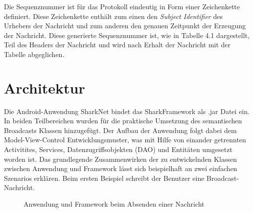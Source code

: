 Die Sequenznummer ist für das Protokoll eindeutig in Form einer Zeichenkette definiert. Diese Zeichenkette enthält zum einen den \textit{Subject Identifier} des Urhebers der Nachricht und zum anderen den genauen Zeitpunkt der Erzeugung der Nachricht. Diese generierte Sequenznummer ist, wie in Tabelle 4.1 dargestellt, Teil des Headers der Nachricht und wird nach Erhalt der Nachricht mit der Tabelle abgeglichen. 
\section{Architektur}
Die Android-Anwendung SharkNet bindet das SharkFramework als .jar Datei ein. In beiden Teilbereichen wurden für die praktische Umsetzung des semantischen Broadcasts Klassen hinzugefügt. Der Aufbau der Anwendung folgt dabei dem Model-View-Control Entwicklungsmuster, was mit Hilfe von einander getrennten Activitites, Services, Datenzugriffsobjekten (DAO) und Entitäten umgesetzt worden ist. Das grundlegende Zusammenwirken der zu entwickelnden Klassen zwischen Anwendung und Framework lässt sich beispielhaft an zwei einfachen Szenarios erklären. Beim ersten Beispiel schreibt der Benutzer eine Broadcast-Nachricht.
\begin{figure}[H]
	\centering
	\hspace*{1cm}
	\caption{Anwendung und Framework beim Absenden einer Nachricht}
	\label{fig:sendenNachrichtStruktur}
\end{figure}
